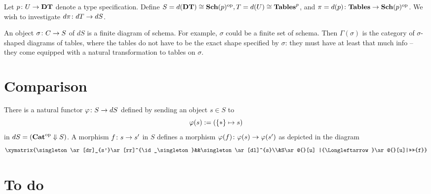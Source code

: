 \documentclass{amsart}
\makeatletter
\def\Down{\Downarrow}
\newcommand{\TriLeft}[7]{\xymatrix{#1\ar[dr]_{#2}\ar[rr]^{#3}&&#4\ar[dl]^{#5}\\&#6\ar@{}[u] |{\Longleftarrow}\ar@{}[u]|>>>>{#7}}}
\makeatother
\begin{document}
\begin{example}

Let $p\colon U\rightarrow{\bf DT}$ denote a type specification.  Define $S=d({\bf DT})\cong{\bf Sch}(p)^\textnormal{op}, T=d(U)\cong{\bf Tables}^p$, and $\pi=d(p)\colon{\bf Tables}\rightarrow{\bf Sch}(p)^\textnormal{op}$.  We wish to investigate $d\pi\colon dT\rightarrow dS$.

An object $\sigma\colon C\rightarrow S$ of $dS$ is a finite diagram of schema.  For example, $\sigma$ could be a finite set of schema.  Then $\Gamma(\sigma)$ is the category of $\sigma$-shaped diagrams of tables, where the tables do not have to be the exact shape specified by $\sigma$: they must have at least that much info -- they come equipped with a natural transformation to tables on $\sigma$.


\end{example}

\section{Comparison}

There is a natural functor $\varphi\colon S\rightarrow dS$ defined by sending an object $s\in S$ to $$\varphi(s):=({\{*\}}\mapsto s)$$ in $dS=(\Cat\op\Down S)$.  A morphism $f\colon s\rightarrow s'$ in $S$ defines a morphism $\varphi(f)\colon\varphi(s)\rightarrow\varphi(s')$ as depicted in the diagram $$\TriLeft{\singleton}{s'}{\id_\singleton}{\singleton}{s}{S}{f}$$

\section{To do}
\end{document}
